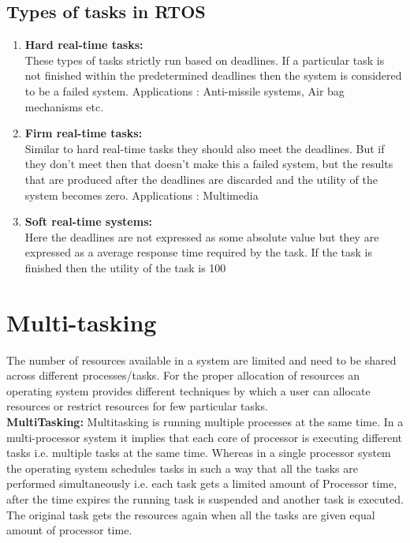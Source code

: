 \documentclass{article}
\begin{document}
\subsection{Types of tasks in RTOS}
\begin{enumerate}
    

\item\textbf{Hard real-time tasks:}\\
These types of tasks strictly run based on deadlines.
If a particular task is not finished within the predetermined deadlines  then the system is considered to be a failed system.
Applications : Anti-missile systems, Air bag mechanisms etc.

\item\textbf{Firm real-time tasks:}\\
Similar  to hard real-time tasks they should also meet the deadlines.
But if they don't meet then that doesn't make this a failed system, but the results that are produced after the deadlines are discarded and the utility of the system becomes zero.
Applications : Multimedia

\item\textbf{Soft real-time systems:}\\
Here the deadlines are not expressed as some absolute value but they are expressed as a average response time required by the task.
If the task is finished then the utility of the task is 100%
\end{enumerate}

\section{Multi-tasking}
The number of resources available in a system are limited and need to be shared across different processes/tasks. For the proper allocation of resources an operating system provides different techniques by which a user can allocate resources or restrict resources for few particular tasks.\\
\textbf {MultiTasking:}
Multitasking is running multiple processes at the same time.
In a multi-processor system it implies that each core of processor is executing different tasks i.e. multiple tasks at the same time.
Whereas in a single processor system the operating system schedules tasks in such a way that all the tasks are performed simultaneously i.e. each task gets a limited amount of Processor time, after the time expires the running task is suspended and another task is executed. The original task gets the resources again when all the tasks are given equal amount of processor time. 
\end{document}

